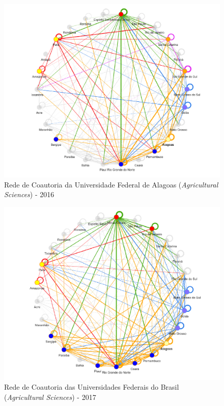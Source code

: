 \begin{figure}[H]
	\centering
	\includegraphics[scale=0.6]{Imagens/rede-agr-AL-2016.pdf}
	\caption{Rede de Coautoria da Universidade Federal de Alagoas (\textit{Agricultural Sciences}) - 2016}
	\label{Rede de Coautoria - UF AGRI AL 2016}
\end{figure}

\begin{figure}[H]
	\centering
	\includegraphics[scale=0.6]{Imagens/rede-agr-AL-2017.pdf}
	\caption{Rede de Coautoria das Universidades Federais do Brasil (\textit{Agricultural Sciences}) - 2017}
	\label{Rede de Coautoria - UF AGRI AL 2017}
\end{figure}

